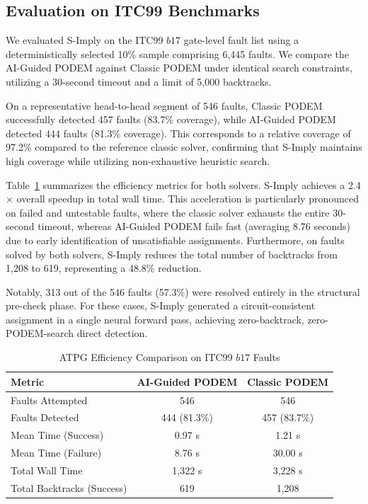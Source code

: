 \documentclass[conference]{IEEEtran}
\begin{document}
\subsection{Evaluation on ITC99 Benchmarks}
We evaluated S-Imply on the ITC99 $b17$ gate-level fault list using a deterministically selected 10\% sample comprising 6,445 faults. We compare the AI-Guided PODEM against Classic PODEM under identical search constraints, utilizing a 30-second timeout and a limit of 5,000 backtracks.

On a representative head-to-head segment of 546 faults, Classic PODEM successfully detected 457 faults (83.7\% coverage), while AI-Guided PODEM detected 444 faults (81.3\% coverage). This corresponds to a relative coverage of 97.2\% compared to the reference classic solver, confirming that S-Imply maintains high coverage while utilizing non-exhaustive heuristic search.

Table~\ref{tab:itc99_efficiency} summarizes the efficiency metrics for both solvers. S-Imply achieves a 2.4$\times$ overall speedup in total wall time. This acceleration is particularly pronounced on failed and untestable faults, where the classic solver exhausts the entire 30-second timeout, whereas AI-Guided PODEM fails fast (averaging 8.76 seconds) due to early identification of unsatisfiable assignments. Furthermore, on faults solved by both solvers, S-Imply reduces the total number of backtracks from 1,208 to 619, representing a 48.8\% reduction.

Notably, 313 out of the 546 faults (57.3\%) were resolved entirely in the structural pre-check phase. For these cases, S-Imply generated a circuit-consistent assignment in a single neural forward pass, achieving zero-backtrack, zero-PODEM-search direct detection.

\begin{table}[htbp]
\caption{ATPG Efficiency Comparison on ITC99 $b17$ Faults}
\begin{center}
\begin{tabular}{|l|c|c|}
\hline
\textbf{Metric} & \textbf{AI-Guided PODEM} & \textbf{Classic PODEM} \\
\hline
Faults Attempted & 546 & 546 \\
Faults Detected & 444 (81.3\%) & 457 (83.7\%) \\
Mean Time (Success) & 0.97 s & 1.21 s \\
Mean Time (Failure) & 8.76 s & 30.00 s \\
Total Wall Time & 1,322 s & 3,228 s \\
Total Backtracks (Success) & 619 & 1,208 \\
\hline
\end{tabular}
\label{tab:itc99_efficiency}
\end{center}
\end{table}
\end{document}
